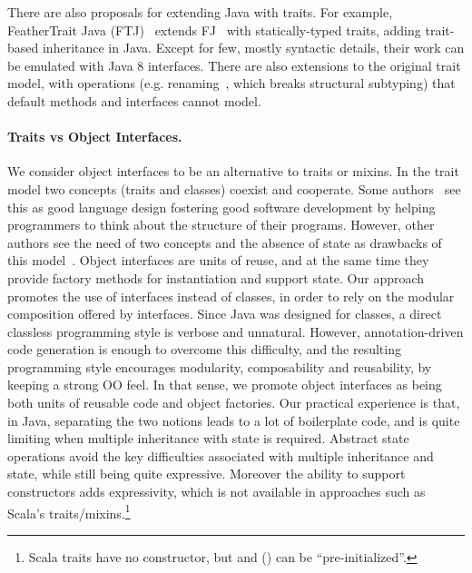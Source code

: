 There are also proposals for extending Java with traits. For
example, FeatherTrait Java (FTJ)~\cite{Liquori08ftj} extends
FJ~\cite{Igarashi01FJ} with statically-typed traits, adding trait-based
inheritance in Java.  Except for few, mostly syntactic details, their work can
be emulated with Java 8 interfaces. There are also extensions to the original
trait model, with operations (e.g. renaming~\cite{reppy2006foundation}, which breaks
structural subtyping) that default methods and interfaces cannot
model.

\paragraph{Traits vs Object Interfaces.}
We consider object interfaces to be an alternative to traits or mixins.  In the
trait model two concepts (traits and classes) coexist and cooperate. Some
authors~\cite{BettiniDSS13} see this as good language design fostering good
software development by helping programmers to think about the structure of
their programs.  However, other authors see the need of two concepts and the
absence of state as drawbacks of this model~\cite{malayeri2009cz}.  Object
interfaces are units of reuse, and at the same time they provide factory methods
for instantiation and support state.  Our approach promotes the use of
interfaces instead of classes, in order to rely on the modular composition
offered by interfaces. Since Java was designed for classes, a direct classless
programming style is verbose and unnatural. However, annotation-driven code
generation is enough to overcome this difficulty, and the resulting programming
style encourages modularity, composability and reusability, by keeping a strong
OO feel. In that sense, we promote object interfaces as being both units of
reusable code and object factories. Our practical experience is that, in Java,
separating the two notions leads to a lot of boilerplate code, and is quite
limiting when multiple inheritance with state is required.  Abstract state
operations avoid the key difficulties associated with multiple inheritance and
state, while still being quite expressive.  Moreover the ability to support
constructors adds expressivity, which is not available in approaches
such as Scala's traits/mixins.\footnote{Scala traits have
  no constructor, but \Q@var@s and (\Q@lazy@) \Q@val@s can be
  ``pre-initialized''.}


